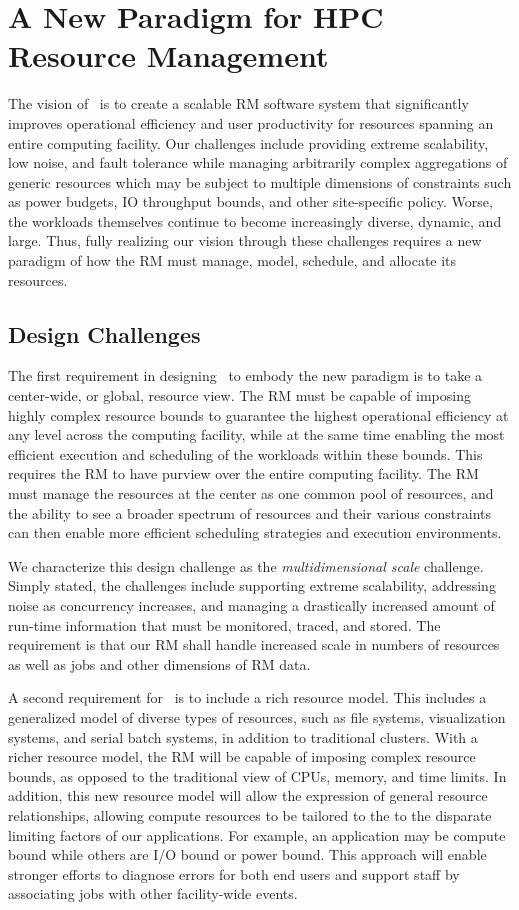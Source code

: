 \section{A New Paradigm for HPC Resource Management}
The vision of \flux\ is to create a scalable RM
software system that significantly improves
operational efficiency and user productivity
for resources spanning an entire
computing facility.
Our challenges include providing extreme
scalability, low noise, and fault tolerance while
managing arbitrarily complex aggregations of generic resources
which may be subject to multiple dimensions of constraints
such as power budgets, IO throughput bounds, and other site-specific
policy.
Worse, the workloads themselves continue to become
increasingly diverse, dynamic, and large.
Thus, fully realizing our vision through
these challenges requires a new paradigm
of how the RM must manage, model, schedule,
and allocate its resources.

\subsection{Design Challenges}
\label{sect:challenges}

The first requirement in designing \flux\ to 
embody the new paradigm is to take a center-wide, or global,
resource view.  The RM must be capable of
imposing highly complex resource bounds
to guarantee the highest operational efficiency
at any level across the computing facility, 
while at the same time enabling the most efficient
execution and scheduling of the workloads
within these bounds.
This requires the RM to have purview over 
the entire computing facility. 
The RM must manage the resources at the center
as one common pool of resources, and the ability
to see a broader spectrum of resources
and their various constraints can then enable
more efficient scheduling strategies
and execution environments. 

We characterize this design challenge as the {\em multidimensional
scale} challenge.  Simply stated, the challenges include
supporting extreme scalability, addressing noise as concurrency
increases, and managing a drastically increased amount of
run-time information that must be monitored, traced, and stored.
The requirement is that our RM shall handle increased scale in
numbers of resources as well as jobs and other dimensions of RM data.

A second requirement for \flux\ is to include a rich resource model.
This includes a generalized model of diverse types of resources,
such as file systems, visualization systems, and serial batch systems,
in addition to traditional clusters.   With a richer resource model,
the RM will be capable of imposing complex resource bounds,
as opposed to the traditional view of CPUs, memory, and time limits.
In addition, this new resource model will allow the expression of
general resource relationships, allowing compute resources to be
tailored to the to the disparate limiting
factors of our applications.  For example, an application may be
compute bound while others are I/O bound or power bound.
This approach will enable stronger efforts to diagnose errors
for both end users and support staff by associating jobs
with other facility-wide events.

